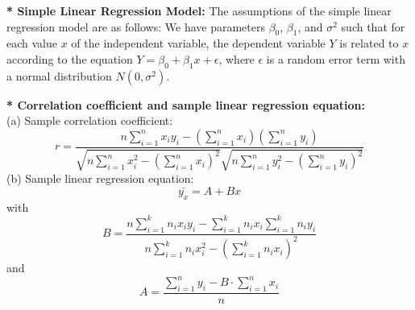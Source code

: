 \documentclass{article}
\begin{document}
	\textbf{* Simple Linear Regression Model:} The assumptions of the simple linear regression model are as follows: We have parameters \( \beta_0 \), \( \beta_1 \), and \( \sigma^2 \) such that for each value \( x \) of the independent variable, the dependent variable \( Y \) is related to \( x \) according to the equation \( Y = \beta_0 + \beta_1 x + \epsilon \), where \( \epsilon \) is a random error term with a normal distribution \( N(0, \sigma^2) \).
	
	\textbf{* Correlation coefficient and sample linear regression equation:}\\
	(a) Sample correlation coefficient:
	\[
	r = \frac{n \sum_{i=1}^{n} x_i y_i - \left(\sum_{i=1}^{n} x_i\right)\left(\sum_{i=1}^{n} y_i\right)}
	{\sqrt{n \sum_{i=1}^{n} x_i^2 - \left(\sum_{i=1}^{n} x_i\right)^2} \sqrt{n \sum_{i=1}^{n} y_i^2 - \left(\sum_{i=1}^{n} y_i\right)^2}}
	\]
	(b) Sample linear regression equation: \[
	\bar{y_x} = A + Bx
	\]
	with \[
	B = \frac{n \sum_{i=1}^{k} n_i x_i y_i - \sum_{i=1}^{k} n_i x_i \sum_{i=1}^{k} n_i y_i}{n \sum_{i=1}^{k} n_i x_i^2 - \left( \sum_{i=1}^{k} n_i x_i \right)^2}
	\]
	and \[
	A = \frac{\sum_{i=1}^{n} y_i - B \cdot \sum_{i=1}^{n} x_i}{n}
	\]
\end{document}

